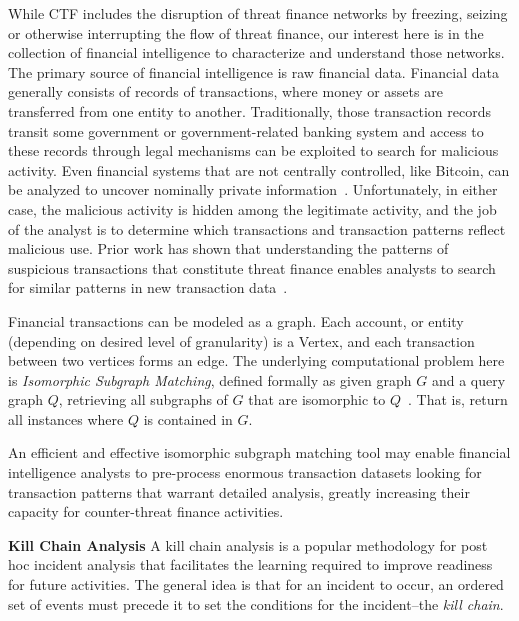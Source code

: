 While CTF includes the disruption of threat finance networks by freezing, seizing or otherwise interrupting the flow of threat finance, our interest here is in the collection of financial intelligence to characterize and understand those networks.
The primary source of financial intelligence is raw financial data. 
Financial data generally consists of records of transactions, where money or assets are transferred from one entity to another. 
Traditionally, those transaction records transit some government or government-related banking system and access to these records through legal mechanisms can be exploited to search for malicious activity. 
Even financial systems that are not centrally controlled, like Bitcoin, can be analyzed to uncover nominally private information~\cite{Balaskas2018, Goldsmith2020}.
Unfortunately, in either case, the malicious activity is hidden among the legitimate activity, and the job of the analyst is to determine which transactions and transaction patterns reflect malicious use.
Prior work has shown that understanding the patterns of suspicious transactions that constitute threat finance enables analysts to search for similar patterns in new transaction data~\cite{Michalak2011, Soltani2016}.

Financial transactions can be modeled as a graph. 
Each account, or entity (depending on desired level of granularity) is a Vertex, and each transaction between two vertices forms an edge. 
The underlying computational problem here is \textit{Isomorphic Subgraph Matching}, defined formally as given graph $G$ and a query graph $Q$, retrieving all subgraphs of $G$ that are isomorphic to $Q$~\cite{Sun2012}. That is, return all instances where $Q$ is contained in $G$.

An efficient and effective isomorphic subgraph matching tool may enable financial intelligence analysts to pre-process enormous transaction datasets looking for transaction patterns that warrant detailed analysis, greatly increasing their capacity for counter-threat finance activities. 

\textbf{Kill Chain Analysis}
A kill chain analysis is a popular methodology for post hoc incident analysis that facilitates the learning required to improve readiness for future activities. 
The general idea is that for an incident to occur, an ordered set of events must precede it to set the conditions for the incident--the \textit{kill chain}.

